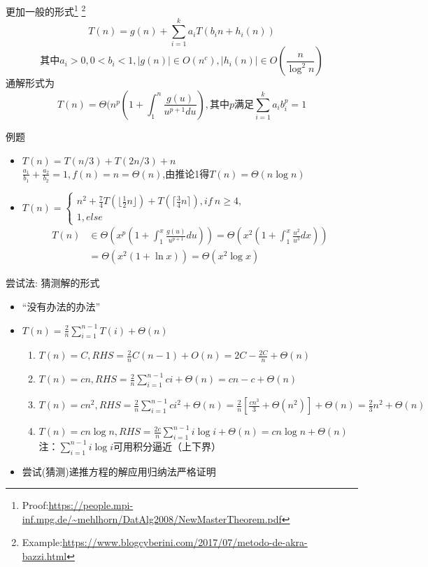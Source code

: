 \documentclass{ctexbeamer}
\begin{document}
    \begin{frame}{更加一般的形式\footnote{Proof:\quad\url{https://people.mpi-inf.mpg.de/~mehlhorn/DatAlg2008/NewMasterTheorem.pdf}}
    \footnote{Example:\quad\url{https://www.blogcyberini.com/2017/07/metodo-de-akra-bazzi.html}}}
    $$T(n)=g(n)+\sum\limits_{i=1}^ka_iT(b_in+h_i(n))$$$$\text{其中}a_i>0, 0<b_i<1,|g(n)|\in O(n^c),|h_i(n)|\in O(\frac{n}{\log^2 n})$$
    通解形式为$$T(n)=\Theta(n^p(1+\int_1^n\frac{g(u)}{u^{p+1}du}),\text{其中}p\text{满足}\sum\limits_{i=1}^ka_ib_i^p=1$$
    \end{frame}

    \begin{frame}{例题}
        \begin{itemize}
        \setlength{\itemsep}{1em}
        \item $T(n)=T(n/3)+T(2n/3)+n$\\
        $\frac{a_1}{b_1}+\frac{a_2}{b_2}=1,f(n)=n=\Theta(n)$,由推论1得$T(n)=\Theta(n\log n)$
        \item $T(n)=\begin{cases} n^2+\frac{7}{4}T(\lfloor\frac{1}{2}n\rfloor)+T(\lceil\frac{3}{4}n\rceil), if\ n\geq 4, \\1, else \end{cases}$\\
        \begin{align*}T(n) &\in \Theta(x^p(1+\int_1^x\frac{g(u)}{u^{p+1}}du)) = \Theta(x^2(1+\int_1^x\frac{u^2}{u^3}dx))\\&=\Theta(x^2(1+\ln x))=\Theta(x^2\log x)\end{align*}
        \end{itemize}
    \end{frame}

    \begin{frame}{尝试法: 猜测解的形式}
    \begin{itemize}
        \item “没有办法的办法”
        \item $T(n)=\frac{2}{n}\sum\limits_{i=1}^{n-1}T(i)+\Theta(n)$
        \begin{enumerate}
        \item $T(n)=C, RHS=\frac{2}{n}C(n-1)+O(n)=2C-\frac{2C}{n}+\Theta(n)$
        \item $T(n)=cn, RHS=\frac{2}{n}\sum\limits_{i=1}^{n-1}ci+\Theta(n)=cn-c+\Theta(n)$
        \item $T(n)=cn^2, RHS=\frac{2}{n}\sum\limits_{i=1}^{n-1}ci^2+\Theta(n)=\frac{2}{n}[\frac{cn^3}{3}+\Theta(n^2)]+\Theta(n)=\frac{2}{3}n^2+\Theta(n)$
        \item $T(n)=cn\log n, RHS=\frac{2c}{n}\sum\limits_{i=1}^{n-1}i\log i+\Theta(n)=cn\log n+\Theta(n)$\\
        注：$\sum\limits_{i=1}^{n-1}i\log i$可用积分逼近（上下界）
        \end{enumerate}
        \item 尝试(猜测)递推方程的解应用归纳法严格证明
    \end{itemize}
    \end{frame}
\end{document}
